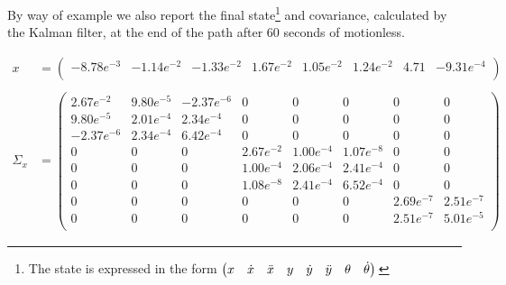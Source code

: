 By way of example we also report the final state\footnote{The state is expressed in the form $\begin{pmatrix}x & \dot{x} & \ddot{x} & y & \dot{y} & \ddot{y} & \theta & \dot{\theta}\\\end{pmatrix}\nonumber\\$} and covariance, calculated by the Kalman filter, at the end of the path after 60 seconds of motionless.
\begin{adjustwidth}{-0.6cm}{10pt}
	\begin{align}
		x &= \begin{pmatrix}
				-8.78e^{-3} & -1.14e^{-2} & -1.33e^{-2} & 1.67e^{-2} & 1.05e^{-2} & 1.24e^{-2} & 4.71 & -9.31e^{-4}\\
				\end{pmatrix}\nonumber\\
		\nonumber\\
		\Sigma_x &= \begin{pmatrix}
					2.67e^{-2} & 9.80e^{-5} & -2.37e^{-6} & 0 & 0 & 0 & 0 & 0\\
					9.80e^{-5} & 2.01e^{-4} & 2.34e^{-4} & 0 & 0 & 0 & 0 & 0\\
					-2.37e^{-6} & 2.34e^{-4} & 6.42e^{-4} & 0 & 0 & 0 & 0 & 0\\
					0 & 0 & 0 & 2.67e^{-2} & 1.00e^{-4} & 1.07e^{-8} & 0 & 0\\
					0 & 0 & 0 & 1.00e^{-4} & 2.06e^{-4} & 2.41e^{-4} & 0 & 0\\
					0 & 0 & 0 & 1.08e^{-8} & 2.41e^{-4} & 6.52e^{-4} & 0 & 0\\
					0 & 0 & 0 & 0 & 0 & 0 & 2.69e^{-7} & 2.51e^{-7}\\
					0 & 0 & 0 & 0 & 0 & 0 & 2.51e^{-7} & 5.01e^{-5}\\
				\end{pmatrix}\nonumber
	\end{align}
\end{adjustwidth}

\vspace{80pt}
